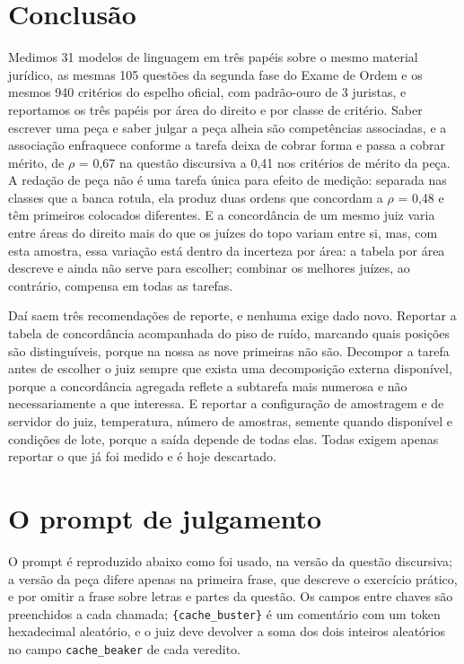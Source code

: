 \documentclass{IOS-Book-Article}
\begin{document}
\section{Conclusão}

Medimos 31 modelos de linguagem em três papéis sobre o mesmo material jurídico, as mesmas 105 questões da segunda fase do Exame de Ordem e os mesmos 940 critérios do espelho oficial, com padrão-ouro de 3 juristas, e reportamos os três papéis por área do direito e por classe de critério. Saber escrever uma peça e saber julgar a peça alheia são competências associadas, e a associação enfraquece conforme a tarefa deixa de cobrar forma e passa a cobrar mérito, de $\rho$ = 0,67 na questão discursiva a 0,41 nos critérios de mérito da peça. A redação de peça não é uma tarefa única para efeito de medição: separada nas classes que a banca rotula, ela produz duas ordens que concordam a $\rho$ = 0,48 e têm primeiros colocados diferentes. E a concordância de um mesmo juiz varia entre áreas do direito mais do que os juízes do topo variam entre si, mas, com esta amostra, essa variação está dentro da incerteza por área: a tabela por área descreve e ainda não serve para escolher; combinar os melhores juízes, ao contrário, compensa em todas as tarefas.

Daí saem três recomendações de reporte, e nenhuma exige dado novo. Reportar a tabela de concordância acompanhada do piso de ruído, marcando quais posições são distinguíveis, porque na nossa as nove primeiras não são. Decompor a tarefa antes de escolher o juiz sempre que exista uma decomposição externa disponível, porque a concordância agregada reflete a subtarefa mais numerosa e não necessariamente a que interessa. E reportar a configuração de amostragem e de servidor do juiz, temperatura, número de amostras, semente quando disponível e condições de lote, porque a saída depende de todas elas. Todas exigem apenas reportar o que já foi medido e é hoje descartado.

\appendix

\section{O prompt de julgamento}

O prompt é reproduzido abaixo como foi usado, na versão da questão discursiva; a versão da peça difere apenas na primeira frase, que descreve o exercício prático, e por omitir a frase sobre letras e partes da questão. Os campos entre chaves são preenchidos a cada chamada; \texttt{\{cache\_buster\}} é um comentário com um token hexadecimal aleatório, e o juiz deve devolver a soma dos dois inteiros aleatórios no campo \texttt{cache\_beaker} de cada veredito.
\end{document}
